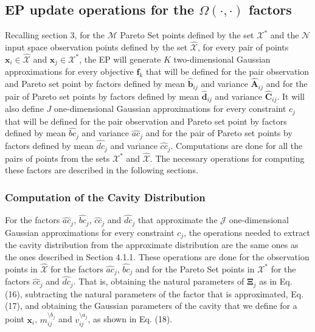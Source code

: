 \subsection{EP update operations for the $\Omega(\cdot,\cdot)$ factors}

Recalling section 3, for the $\mathcal{M}$ Pareto Set points defined by the set $\mathcal{X}^*$ and the $\mathcal{N}$ input space observation points defined by the set $\hat{\mathcal{X}}$, for every pair of points $\boldsymbol{x}_i \in \hat{\mathcal{X}}$ and $\boldsymbol{x}_j \in \mathcal{X}^*$, the EP will generate $K$ two-dimensional Gaussian approximations for every objective $\boldsymbol{f}_k$ that will be defined for the pair observation and Pareto set point by factors defined by mean $\hat{\boldsymbol{b}}_{ij}$ and variance $\hat{\boldsymbol{A}}_{ij}$ and for the pair of Pareto set points by factors defined by mean $\hat{\boldsymbol{d}}_{ij}$ and variance $\hat{\boldsymbol{C}}_{ij}$. It will also define $J$ one-dimensional Gaussian approximations for every constraint $c_j$ that will be defined for the pair observation and Pareto set point by factors defined by mean $\hat{bc}_j$ and variance $\hat{ac}_j$ and for the pair of Pareto set points by factors defined by mean $\hat{dc}_j$ and variance $\hat{cc}_j$. Computations are done for all the pairs of points from the sets $\mathcal{X}^*$ and $\hat{\mathcal{X}}$. The necessary operations for computing these factors are described in the following sections.

\subsubsection{Computation of the Cavity Distribution}
For the factors $\hat{ac}_j$, $\hat{bc}_j$, $\hat{cc}_j$ and $\hat{dc}_j$ that approximate the $\mathcal{J}$ one-dimensional Gaussian approximations for every constraint $c_j$, the operations needed to extract the cavity distribution from the approximate distribution are the same ones as the ones described in Section 4.1.1. These operations are done for the observation points in $\hat{\mathcal{X}}$ for the factors $\hat{ac}_j$, $\hat{bc}_j$ and for the Pareto Set points in $\mathcal{X}^*$ for the factors $\hat{cc}_j$ and $\hat{dc}_j$. That is, obtaining the natural parameters of $\boldsymbol{\Xi}_j$ as in Eq. (16), subtracting the natural parameters of the factor that is approximated, Eq. (17), and obtaining the Gaussian parameters of the cavity that we define for a point $\boldsymbol{x}_i$, $m_{ij}^{\setminus b_j}$ and $v_{ij}^{\setminus a_j}$, as shown in Eq. (18).

